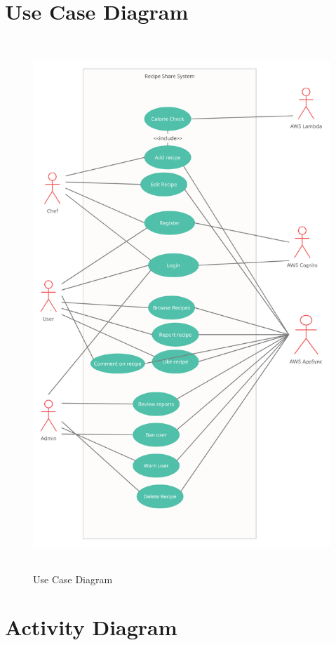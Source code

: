 \clearpage

\section{Use Case Diagram}

\begin{figure}[!hb]
\centering
\caption[Use Case Diagram]{Use Case Diagram}%
\label{fig:use_case_diagram}
\includegraphics[width=\linewidth,height=20cm,keepaspectratio]{img/use_case_diagram}
\end{figure}

\clearpage

\section{Activity Diagram}

